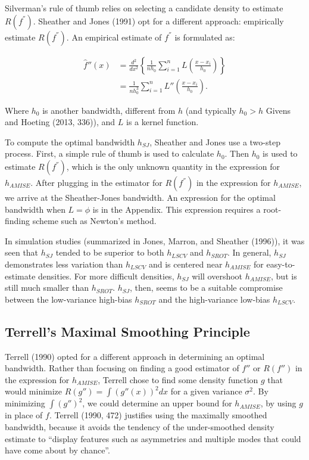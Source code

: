 \documentclass[]{article}
\begin{document}
Silverman's rule of thumb relies on selecting a candidate density to
estimate \(R(f^{''})\). Sheather and Jones (1991) opt for a different
approach: empirically estimate \(R(f^{''})\). An empirical estimate of
\(f^{''}\) is formulated as:

\[
\begin{aligned}
\hat{f}''(x) &= \frac{d^2}{dx^2} \left\{\frac{1}{nh_0} \sum_{i=1}^{n} L\left(\frac{x - x_i}{h_0}  \right) \right\}\\
&= \frac{1}{nh_0^3} \sum_{i=1}^{n} L''\left(\frac{x-x_i}{h_0} \right).
\end{aligned}
\]

Where \(h_0\) is another bandwidth, different from \(h\) (and typically
\(h_0 > h\) Givens and Hoeting (2013, 336)), and \(L\) is a kernel
function.

To compute the optimal bandwidth \(h_{SJ}\), Sheather and Jones use a
two-step process. First, a simple rule of thumb is used to calculate
\(h_0\). Then \(h_0\) is used to estimate \(R(f^{''})\), which is the
only unknown quantity in the expression for \(h_{AMISE}\). After
plugging in the estimator for \(R(f^{''})\) in the expression for
\(h_{AMISE}\), we arrive at the Sheather-Jones bandwidth. An expression
for the optimal bandwidth when \(L = \phi\) is in the Appendix. This
expression requires a root-finding scheme such as Newton's method.

In simulation studies (summarized in Jones, Marron, and Sheather
(1996)), it was seen that \(h_{SJ}\) tended to be superior to both
\(h_{LSCV}\) and \(h_{SROT}\). In general, \(h_{SJ}\) demonstrates less
variation than \(h_{LSCV}\) and is centered near \(h_{AMISE}\) for
easy-to-estimate densities. For more difficult densities, \(h_{SJ}\)
will overshoot \(h_{AMISE}\), but is still much smaller than
\(h_{SROT}\). \(h_{SJ}\), then, seems to be a suitable compromise
between the low-variance high-bias \(h_{SROT}\) and the high-variance
low-bias \(h_{LSCV}\).

\subsection{Terrell's Maximal Smoothing
Principle}\label{terrells-maximal-smoothing-principle}

Terrell (1990) opted for a different approach in determining an optimal
bandwidth. Rather than focusing on finding a good estimator of \(f''\)
or \(R(f'')\) in the expression for \(h_{AMISE}\), Terrell chose to find
some density function \(g\) that would minimize
\(R(g'') = \int (g '' (x))^2 dx\) for a given variance \(\sigma^2\). By
minimizing \(\int (g'')^2\), we could determine an upper bound for
\(h_{AMISE}\), by using \(g\) in place of \(f\). Terrell (1990, 472)
justifies using the maximally smoothed bandwidth, because it avoids the
tendency of the under-smoothed density estimate to ``display features
such as asymmetries and multiple modes that could have come about by
chance''.
\end{document}
